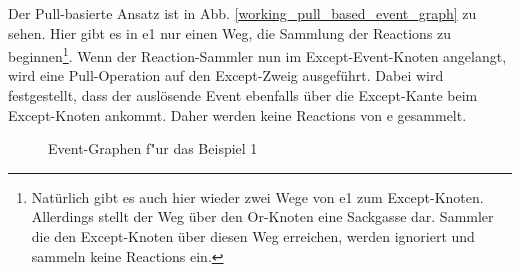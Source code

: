 Der Pull-basierte Ansatz ist in Abb. \ref{working_pull_based_event_graph} zu
sehen. Hier gibt es in e1 nur einen Weg, die Sammlung der Reactions zu
beginnen\footnote{Natürlich gibt es auch hier wieder zwei Wege von e1 zum
Except-Knoten. Allerdings stellt der Weg über den Or-Knoten eine Sackgasse
dar. Sammler die den Except-Knoten über diesen Weg erreichen, werden ignoriert
und sammeln keine Reactions ein.}. Wenn der Reaction-Sammler nun im
Except-Event-Knoten angelangt, wird eine Pull-Operation auf den Except-Zweig ausgeführt. Dabei  wird
festgestellt, dass der auslösende Event ebenfalls über die Except-Kante beim 
Except-Knoten ankommt. Daher werden keine Reactions von e gesammelt.


 


\begin{figure}[htp]
\centering
{}
\caption{Event-Graphen f"ur das Beispiel 1}
\end{figure}

